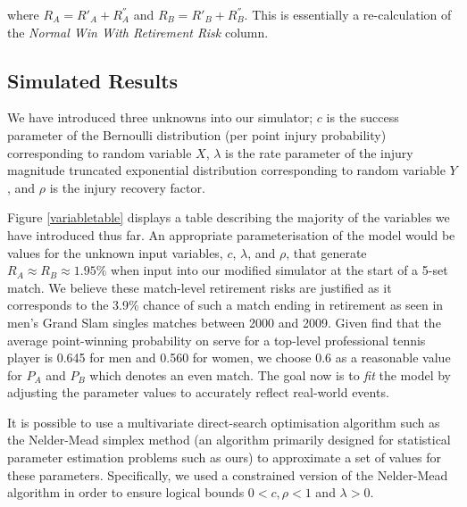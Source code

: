 \documentclass[letterpaper,12pt]{article}
\begin{document}
where $R_A = R'_A + R^{''}_A$ and $R_B = R'_B + R^{''}_B$.  This is essentially a re-calculation of the \textit{Normal Win With Retirement Risk} column.

\subsection{Simulated Results}

We have introduced three unknowns into our simulator; $c$ is the success parameter of the Bernoulli distribution (per point injury probability) corresponding to random variable $X$, $\lambda$ is the rate parameter of the injury magnitude truncated exponential distribution corresponding to random variable $Y$, and $\rho$ is the injury recovery factor.

Figure \ref{variabletable} displays a table describing the majority of the variables we have introduced thus far.  An appropriate parameterisation of the model would be values for the unknown input variables, $c$, $\lambda$, and $\rho$, that generate $R_A \approx R_B \approx 1.95\%$ when input into our modified simulator at the start of a 5-set match.  We believe these match-level retirement risks are justified as it corresponds to the 3.9\% chance of such a match ending in retirement as seen in men's Grand Slam singles matches between 2000 and 2009.  Given \cite{dominance} find that the average point-winning probability on serve for a top-level professional tennis player is 0.645 for men and 0.560 for women, we choose 0.6 as a reasonable value for $P_A$ and $P_B$ which denotes an even match.  The goal now is to \textit{fit} the model by adjusting the parameter values to accurately reflect real-world events.

It is possible to use a multivariate direct-search optimisation algorithm such as the Nelder-Mead simplex method (an algorithm primarily designed for statistical parameter estimation problems such as ours) to approximate a set of values for these parameters.  Specifically, we used a constrained version of the Nelder-Mead algorithm in order to ensure logical bounds $0 < c, \rho < 1$ and $\lambda > 0$.
\end{document}
